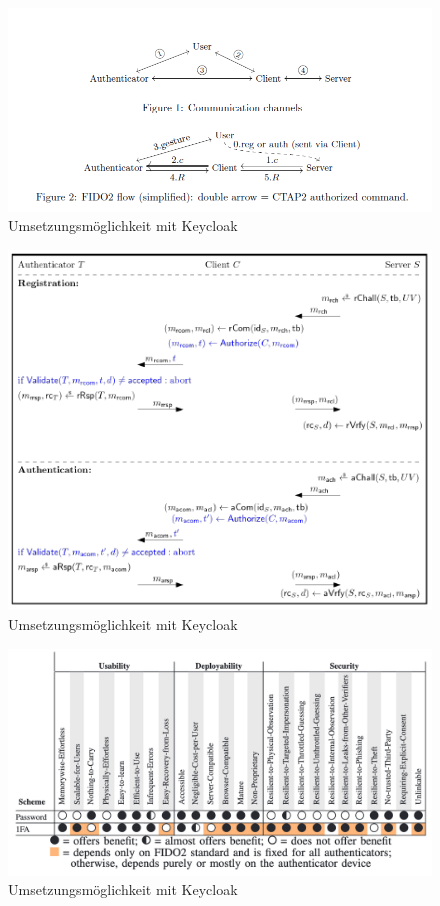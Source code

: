 \begin{figure}[h]
	\centering 
	\includegraphics[width=1\textwidth]{img/abbildungen/fido2-simple.png}
	\captionsetup{format=hang}
	\caption{Umsetzungsmöglichkeit mit Keycloak}
\end{figure}

\begin{figure}[h]
	\centering 
	\includegraphics[width=1\textwidth]{img/abbildungen/Fido2.png}
	\captionsetup{format=hang}
	\caption{Umsetzungsmöglichkeit mit Keycloak}
\end{figure}

\begin{figure}[h]
	\centering 
	\includegraphics[width=1\textwidth]{img/abbildungen/fido2_usability.png}
	\captionsetup{format=hang}
	\caption{Umsetzungsmöglichkeit mit Keycloak}
\end{figure}

